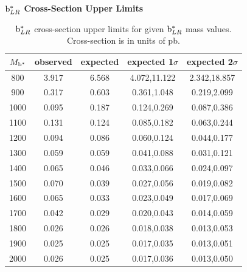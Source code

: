 \begin{table}
\begin{center}
\bf{$\mathrm{b}^{*}_{LR}$ Cross-Section Upper Limits}\\
\begin{tabular}{|c||c|c|c|c|}
\hline
\bf{$M_{\mathrm{b}^{*}}$} & \bf{observed}  & \bf{expected} & \bf{expected 1$\sigma$}  & \bf{expected 2$\sigma$} \\
\hline
\hline
800 & 3.917 & 6.568 & 4.072,11.122 & 2.342,18.857\\ 
\hline
900 & 0.317 & 0.603 & 0.361,1.048 & 0.219,2.099\\ 
\hline
1000 & 0.095 & 0.187 & 0.124,0.269 & 0.087,0.386\\ 
\hline
1100 & 0.131 & 0.124 & 0.085,0.182 & 0.063,0.244\\ 
\hline
1200 & 0.094 & 0.086 & 0.060,0.124 & 0.044,0.177\\ 
\hline
1300 & 0.059 & 0.059 & 0.041,0.088 & 0.031,0.121\\ 
\hline
1400 & 0.065 & 0.046 & 0.033,0.066 & 0.024,0.097\\ 
\hline
1500 & 0.070 & 0.039 & 0.027,0.056 & 0.019,0.082\\ 
\hline
1600 & 0.065 & 0.033 & 0.023,0.049 & 0.017,0.069\\ 
\hline
1700 & 0.042 & 0.029 & 0.020,0.043 & 0.014,0.059\\ 
\hline
1800 & 0.026 & 0.026 & 0.018,0.038 & 0.013,0.053\\ 
\hline
1900 & 0.025 & 0.025 & 0.017,0.035 & 0.013,0.051\\ 
\hline
2000 & 0.026 & 0.025 & 0.017,0.036 & 0.013,0.050\\ 

\hline
\end{tabular}
\end{center}
\caption{$\mathrm{b}^{*}_{LR}$ cross-section upper limits for given $\mathrm{b}^{*}_{LR}$ mass values.  Cross-section is in units of pb.}
\label{table:bsupperxsecLR}
\end{table}


